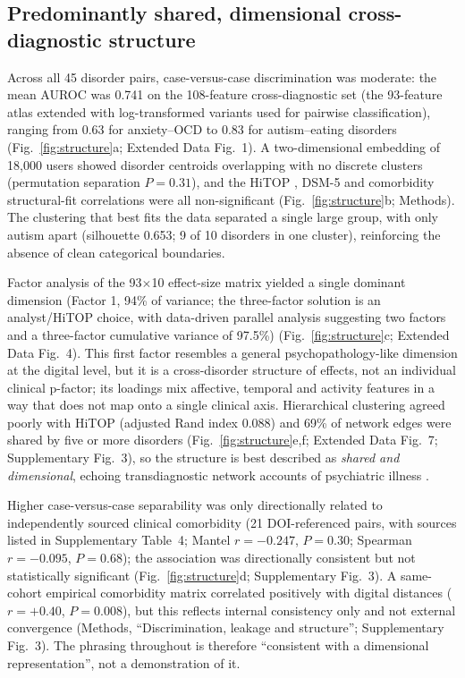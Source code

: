\documentclass[11pt]{article}
\newcommand{\supfig}[1]{Supplementary Fig.~#1}
\newcommand{\suptab}[1]{Supplementary Table~#1}
\newcommand{\edfig}[1]{Extended Data Fig.~#1}
\begin{document}
\subsection*{Predominantly shared, dimensional cross-diagnostic structure}
Across all 45 disorder pairs, case-versus-case discrimination was moderate: the mean AUROC was
0.741 on the 108-feature cross-diagnostic set (the 93-feature atlas extended with log-transformed variants used for pairwise classification), ranging from 0.63 for anxiety--OCD to 0.83 for autism--eating
disorders (Fig.~\ref{fig:structure}a; \edfig{1}). A two-dimensional embedding of 18{,}000 users showed
disorder centroids overlapping with no discrete clusters (permutation separation $P=0.31$),
and the HiTOP \cite{kotov2017hitop}, DSM-5 \cite{apa2013dsm5} and comorbidity structural-fit correlations were all non-significant
(Fig.~\ref{fig:structure}b; Methods). The clustering that best fits the data separated a single
large group, with only autism apart (silhouette 0.653; 9 of 10 disorders in one cluster),
reinforcing the absence of clean categorical boundaries.

Factor analysis of the 93$\times$10 effect-size matrix yielded a single dominant dimension
(Factor 1, 94\% of variance; the three-factor solution is an analyst/HiTOP choice, with
data-driven parallel analysis suggesting two factors and a three-factor cumulative variance of
97.5\%) (Fig.~\ref{fig:structure}c; \edfig{4}). This first factor resembles a general
psychopathology-like dimension at the digital level, but it is a cross-disorder structure of
effects, not an individual clinical p-factor; its loadings mix affective, temporal and activity
features in a way that does not map onto a single clinical axis. Hierarchical clustering agreed
poorly with HiTOP (adjusted Rand index 0.088) and 69\% of network edges were shared by five or
more disorders (Fig.~\ref{fig:structure}e,f; \edfig{7}; \supfig{3}), so the structure is best
described as \emph{shared and dimensional}, echoing transdiagnostic network accounts of
psychiatric illness \cite{hitopnetwork2023}.

Higher case-versus-case separability was only directionally related to independently sourced
clinical comorbidity (21 DOI-referenced pairs, with sources listed in \suptab{4}; Mantel
$r=-0.247$, $P=0.30$; Spearman $r=-0.095$, $P=0.68$); the
association was directionally consistent but not statistically significant
(Fig.~\ref{fig:structure}d; \supfig{3}). A same-cohort empirical comorbidity matrix
correlated positively with digital distances ($r=+0.40$, $P=0.008$), but this reflects
internal consistency only and not external convergence (Methods, ``Discrimination, leakage and structure''; \supfig{3}). The phrasing
throughout is therefore ``consistent with a dimensional representation'', not a demonstration
of it.
\end{document}
